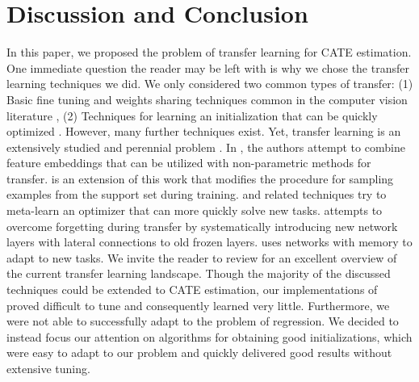 \section{Discussion and Conclusion}



In this paper, we proposed the problem of transfer learning for CATE estimation. One immediate question the reader may be left with is why we chose the transfer learning techniques we did. We only considered two common types of transfer: 
(1) Basic fine tuning and weights sharing techniques common in the computer vision literature \citep{finetune0,finetune2,finetune1, donahu, koch},
(2) Techniques for learning an initialization that can be quickly optimized \citep{maml,hugo,reptile}. However, many further techniques exist. Yet, transfer learning is an extensively studied and perennial problem \citep{schmid,bengio,thurn2,thrun,taylor,silver}. In \cite{oriol}, the authors attempt to combine feature embeddings that can be utilized with non-parametric methods for transfer. \cite{proto} is an extension of this work that modifies the procedure for sampling examples from the support set during training. \cite{marcin} and related techniques try to meta-learn an optimizer that can more quickly solve new tasks. \cite{progressive} attempts to overcome forgetting during transfer by systematically introducing new network layers with lateral connections to old frozen layers. \cite{yu} uses networks with memory to adapt to new tasks. We invite the reader to review \cite{maml} for an excellent overview of the current transfer learning landscape. Though the majority of the discussed techniques could be extended to CATE estimation, our implementations of \cite{progressive, marcin} proved difficult to tune and consequently learned very little. Furthermore, we were not able to successfully adapt \cite{proto} to the problem of regression. We decided to instead focus our attention on algorithms for obtaining good initializations, which were easy to adapt to our problem and quickly delivered good results without extensive tuning. 





